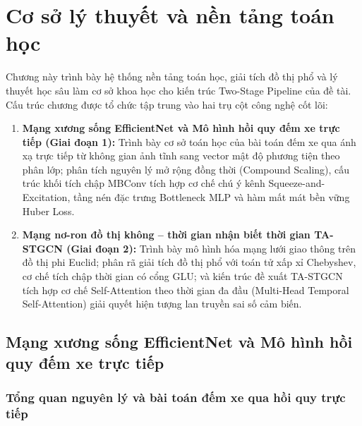 \chapter{Cơ sở lý thuyết và nền tảng toán học}
\label{chap:co_so_ly_thuyet}

Chương này trình bày hệ thống nền tảng toán học, giải tích đồ thị phổ và lý thuyết học sâu làm cơ sở khoa học cho kiến trúc Two-Stage Pipeline của đề tài. Cấu trúc chương được tổ chức tập trung vào hai trụ cột công nghệ cốt lõi:
\begin{enumerate}
    \item \textbf{Mạng xương sống EfficientNet và Mô hình hồi quy đếm xe trực tiếp (Giai đoạn 1):} Trình bày cơ sở toán học của bài toán đếm xe qua ánh xạ trực tiếp từ không gian ảnh tĩnh sang vector mật độ phương tiện theo phân lớp; phân tích nguyên lý mở rộng đồng thời (Compound Scaling), cấu trúc khối tích chập MBConv tích hợp cơ chế chú ý kênh Squeeze-and-Excitation, tầng nén đặc trưng Bottleneck MLP và hàm mất mát bền vững Huber Loss.
    \item \textbf{Mạng nơ-ron đồ thị không -- thời gian nhận biết thời gian TA-STGCN (Giai đoạn 2):} Trình bày mô hình hóa mạng lưới giao thông trên đồ thị phi Euclid; phân rã giải tích đồ thị phổ với toán tử xấp xỉ Chebyshev, cơ chế tích chập thời gian có cổng GLU; và kiến trúc đề xuất TA-STGCN tích hợp cơ chế Self-Attention theo thời gian đa đầu (Multi-Head Temporal Self-Attention) giải quyết hiện tượng lan truyền sai số cảm biến.
\end{enumerate}

\section{Mạng xương sống EfficientNet và Mô hình hồi quy đếm xe trực tiếp}
\label{sec:kien_truc_efficientnet}

\subsection{Tổng quan nguyên lý và bài toán đếm xe qua hồi quy trực tiếp}
\label{sec:nguyen_ly_hoi_quy_dem_xe}

